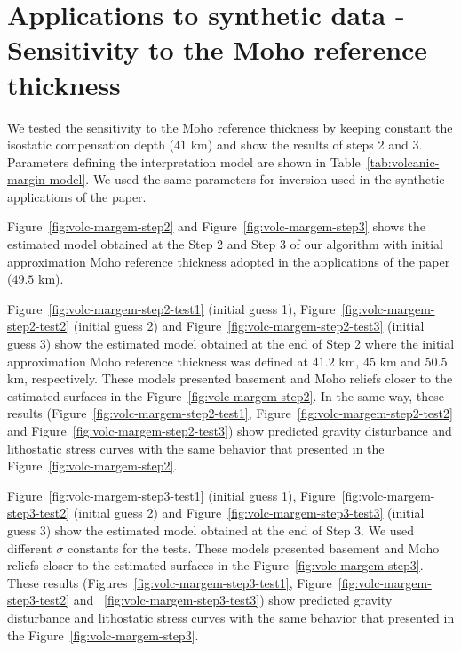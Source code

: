 \documentclass[manuscript]{geophysics}
\begin{document}
\section{Applications to synthetic data - Sensitivity to the Moho reference thickness}

We tested the sensitivity to the Moho reference thickness by keeping constant the isostatic compensation depth ($41$ km) and show the results of steps 2 and 3. Parameters defining the interpretation model are shown in Table~\ref{tab:volcanic-margin-model}.  We used the same parameters for inversion used in the synthetic applications of the paper.

Figure~\ref{fig:volc-margem-step2} and Figure~\ref{fig:volc-margem-step3} shows the estimated model obtained at the Step 2 and Step 3 of our algorithm with initial approximation Moho reference thickness adopted in the applications of the paper ($49.5$ km). 

Figure~\ref{fig:volc-margem-step2-test1} (initial guess 1), Figure~\ref{fig:volc-margem-step2-test2} (initial guess 2) and Figure~\ref{fig:volc-margem-step2-test3} (initial guess 3) show the estimated model obtained at the end of Step 2 where the initial approximation Moho reference thickness was defined at $41.2$ km, $45$ km and $50.5$ km, respectively.  These models presented basement and Moho reliefs closer to the estimated surfaces in the Figure~\ref{fig:volc-margem-step2}. In the same way, these results (Figure~\ref{fig:volc-margem-step2-test1}, Figure~\ref{fig:volc-margem-step2-test2} and Figure~\ref{fig:volc-margem-step2-test3}) show predicted gravity disturbance and lithostatic stress curves with the same behavior that presented in the Figure~\ref{fig:volc-margem-step2}. 

Figure~\ref{fig:volc-margem-step3-test1} (initial guess 1), Figure~\ref{fig:volc-margem-step3-test2} (initial guess 2) and Figure~\ref{fig:volc-margem-step3-test3} (initial guess 3) show the estimated model obtained at the end of Step 3. We used different $\sigma$ constants for the tests. These models presented basement and Moho reliefs closer to the estimated surfaces in the Figure~\ref{fig:volc-margem-step3}. These results (Figures~\ref{fig:volc-margem-step3-test1}, Figure~\ref{fig:volc-margem-step3-test2} and ~\ref{fig:volc-margem-step3-test3}) show predicted gravity disturbance and lithostatic stress curves with the same behavior that presented in the Figure~\ref{fig:volc-margem-step3}. 
\end{document}
